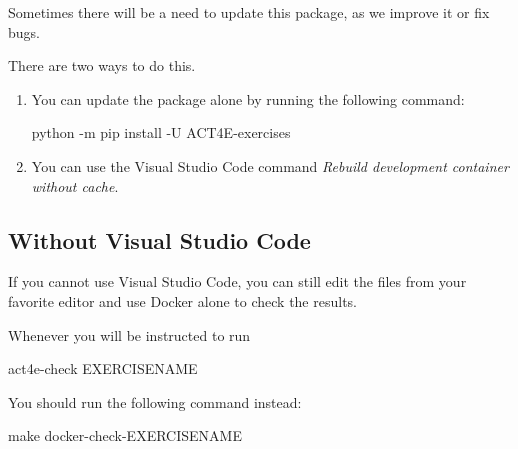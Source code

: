 Sometimes there will be a need to update this package, as we improve it or fix bugs.

There are two ways to do this.
\begin{enumerate}
    \item You can update the package alone by running the following command:

          \begin{console}
        python -m pip install -U ACT4E-exercises
    \end{console}
    \item You can use the Visual Studio Code command \emph{Rebuild development container without cache}.
\end{enumerate}

%
%
%
%
%
%
%
%
%

\subsection{Without Visual Studio Code}

If you cannot use Visual Studio Code, you can still edit the files from your favorite editor and use Docker alone
to check the results.

Whenever you will be instructed to run
\begin{console}
    act4e-check EXERCISENAME
\end{console}
You should run the following command instead:
\begin{console}
make docker-check-EXERCISENAME
\end{console}

